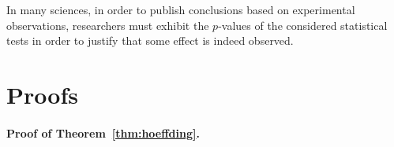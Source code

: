 \documentclass[
	fontsize=11pt, %
	twoside=false, %
	numbers=noenddot, %
]{kaobook}
\begin{document}
In many sciences, in order to publish conclusions based on experimental observations, researchers must exhibit the $p$-values of the considered statistical tests in order to justify that some effect is indeed observed.


\section{Proofs} %
\label{sec:chap03-proofs}


\paragraph{Proof of Theorem~\ref{thm:hoeffding}.} 
\end{document}
